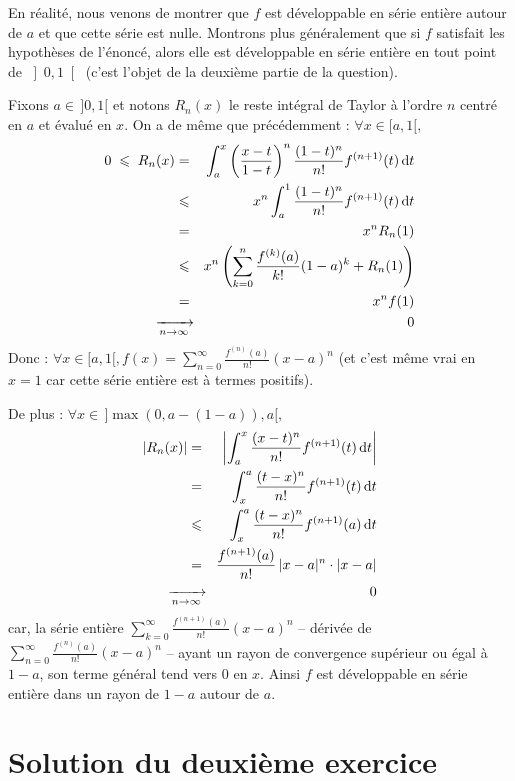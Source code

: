 En réalité, nous venons de montrer que $f$ est développable en série entière autour de $a$ et que cette série est nulle. Montrons plus généralement que si $f$ satisfait les hypothèses de l'énoncé, alors elle est développable en série entière en tout point de $\left]0,1\right[$ (c'est l'objet de la deuxième partie de la question).

Fixons $a\in \,]0,1[$ et notons $R_{n} (x)$ le reste intégral de Taylor à l'ordre $n$ centré en $a$ et évalué en $x$. On a de même que précédemment : $\forall x\in [a,1[,$
\begin{eqnarray*}
0 \;\leqslant \; R_{n} (x) &=& \int _{a} ^{x} \left( \frac{x-t}{1-t} \right)^{n} \frac{(1-t)^{n} }{n!} f^{(n+1)}(t) \,\mathrm{d}t\\
&\leqslant & x^{n} \int _{a} ^{1} \frac{(1-t)^{n} }{n!} f^{(n+1)}(t) \,\mathrm{d}t\\
&=& x^{n} R_{n} (1)\\
&\leqslant & x^{n} \left(\sum_{k=0}^n \frac{f^{(k)}(a)}{k!} (1-a)^{k} +R_{n} (1)\right)\\
&=& x^{n} f(1) \\
&\text{\makebox[0mm]{$\xrightarrow[n\rightarrow\infty]{}$}} & \ \ 0
\end{eqnarray*}
Donc : $\forall x\in [a,1[,f(x)=\displaystyle \sum _{n=0} ^{\infty } \frac{f^{(n)}(a)}{n!} (x-a)^{n}$ (et c'est même vrai en $x=1$ car cette série entière est à termes positifs).

De plus : $\forall x\in \,]\max (0,a-(1-a)),a[,$
\begin{eqnarray*}
|R_{n} (x)| &=& \left| \int _{a} ^{x} \frac{(x-t)^{n} }{n!} f^{(n+1)}(t) \,\mathrm{d}t \right|\\
&=& \int _{x} ^{a} \frac{(t-x)^{n} }{n!} f^{(n+1)}(t) \,\mathrm{d}t\\
&\leqslant & \int _{x} ^{a} \frac{(t-x)^{n} }{n!} f^{(n+1)}(a) \,\mathrm{d}t\\
&=& \frac{f^{(n+1)}(a)}{n!} \, |x-a|^{n} \cdot  |x-a| \\
&\text{\makebox[0mm]{$\xrightarrow[n\rightarrow\infty]{}$}} & \ \ 0
\end{eqnarray*}
car, la série entière $\displaystyle \sum _{k=0} ^{\infty } \frac{f^{(n+1)}(a)}{n!} (x-a)^{n}$ -- dérivée de $\displaystyle \sum _{n=0} ^{\infty } \frac{f^{(n)}(a)}{n!} (x-a)^{n}$ -- ayant un rayon de convergence supérieur ou égal à $1-a$, son terme général tend vers 0 en $x$. Ainsi $f$ est développable en série entière dans un rayon de $1-a$ autour de $a$.


\section{Solution du deuxième exercice} %

